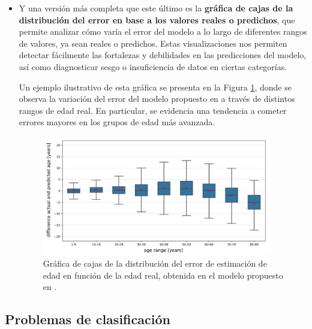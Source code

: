 \begin{itemize}
    \item Y una versión más completa que este último es la \textbf{gráfica de cajas de la distribución del 
    error en base a los valores reales o predichos}, que permite analizar cómo varía el error del modelo a lo 
    largo de diferentes rangos de valores, ya sean reales o predichos. Estas visualizaciones nos permiten 
    detectar fácilmente las fortalezas y debilidades en las predicciones del modelo, así como diagnosticar 
    sesgo o insuficiencia de datos en ciertas categorías.
    
    Un ejemplo ilustrativo de esta gráfica se presenta en la Figura \ref{fig:boxplot_error_vs_act_AE}, donde 
    se observa la variación del error del modelo propuesto en \cite{heinrich2024} a través de distintos rangos 
    de edad real. En particular, se evidencia una tendencia a cometer errores mayores en los grupos de edad 
    más avanzada.

    \begin{figure}[h]
        \centering
        \includegraphics[width=0.95\textwidth]{capitulos/cap_02/imagenes/boxplot_error_vs_act_AE.png}
        \caption{
            Gráfica de cajas de la distribución del error de estimación de edad en función de la edad 
            real, obtenida en el modelo propuesto en \cite{heinrich2024}.
        } 
        \label{fig:boxplot_error_vs_act_AE}
    \end{figure}

\end{itemize}







\subsection{Problemas de clasificación}

